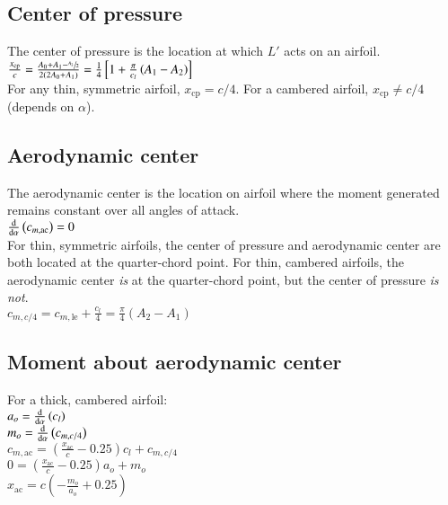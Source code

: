\subsection*{Center of pressure}
The center of pressure is the location at which $L'$ acts on an airfoil.\\
$\frac{x_\text{cp}}{c}=\frac{A_0+A_1-\sfrac{A_2}{2}}{2(2A_0+A_1)}=\frac{1}{4}\left[1+\frac{\pi}{c_l}\left(A_1-A_2\right)\right]$\\
For any thin, symmetric airfoil, $x_\text{cp}=c/4$. For a cambered airfoil, $x_\text{cp}\neq c/4$ (depends on $\alpha$).
\subsection*{Aerodynamic center}
The aerodynamic center is the location on airfoil where the moment generated remains constant over all angles of attack.\\
$\odv*[fun=true]{c_{m,\text{ac}}}{\alpha}=0$\\
For thin, symmetric airfoils, the center of pressure and aerodynamic center are both located at the quarter-chord point.
For thin, cambered airfoils, the aerodynamic center \textit{is} at the quarter-chord point, but the center of pressure \textit{is not}.\\
$c_{m,c/4}=c_{m,\text{le}}+\frac{c_l}{4}=\frac{\pi}{4}\left(A_2-A_1\right)$
\subsection*{Moment about aerodynamic center}
For a thick, cambered airfoil:\\
$a_o=\odv*[fun=true]{c_l}{\alpha}$\\
$m_o=\odv*[fun=true]{c_{m,c/4}}{\alpha}$\\
$c_{m,\text{ac}}=\left(\frac{x_\text{ac}}{c}-0.25\right)c_l+c_{m,c/4}$\\
$0=\left(\frac{x_\text{ac}}{c}-0.25\right)a_o+m_o$\hfill{}\\
$x_\text{ac}=c\left(-\frac{m_o}{a_o}+0.25\right)$